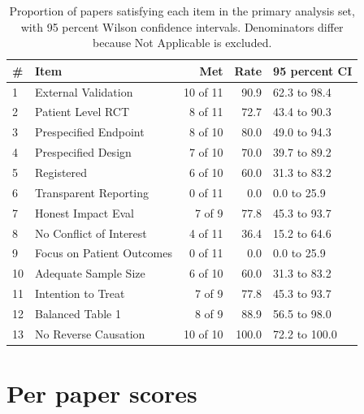 \documentclass{article}
\begin{document}
\begin{table}[h]
  \caption{Proportion of papers satisfying each item in the primary analysis set, with 95 percent
  Wilson confidence intervals. Denominators differ because Not Applicable is excluded.}
  \label{tab:itemrates}
  \centering
  \small
  \begin{tabular}{llrrl}
    \toprule
    \# & Item & Met & Rate & 95 percent CI \\
    \midrule
    1  & External Validation       & 10 of 11 & 90.9 & 62.3 to 98.4 \\
    2  & Patient Level RCT         & 8 of 11  & 72.7 & 43.4 to 90.3 \\
    3  & Prespecified Endpoint     & 8 of 10  & 80.0 & 49.0 to 94.3 \\
    4  & Prespecified Design       & 7 of 10  & 70.0 & 39.7 to 89.2 \\
    5  & Registered                & 6 of 10  & 60.0 & 31.3 to 83.2 \\
    6  & Transparent Reporting     & 0 of 11  & 0.0  & 0.0 to 25.9 \\
    7  & Honest Impact Eval        & 7 of 9   & 77.8 & 45.3 to 93.7 \\
    8  & No Conflict of Interest   & 4 of 11  & 36.4 & 15.2 to 64.6 \\
    9  & Focus on Patient Outcomes & 0 of 11  & 0.0  & 0.0 to 25.9 \\
    10 & Adequate Sample Size      & 6 of 10  & 60.0 & 31.3 to 83.2 \\
    11 & Intention to Treat        & 7 of 9   & 77.8 & 45.3 to 93.7 \\
    12 & Balanced Table 1          & 8 of 9   & 88.9 & 56.5 to 98.0 \\
    13 & No Reverse Causation      & 10 of 10 & 100.0 & 72.2 to 100.0 \\
    \bottomrule
  \end{tabular}
\end{table}

\section{Per paper scores}
\label{app:papers-scores}
\end{document}
